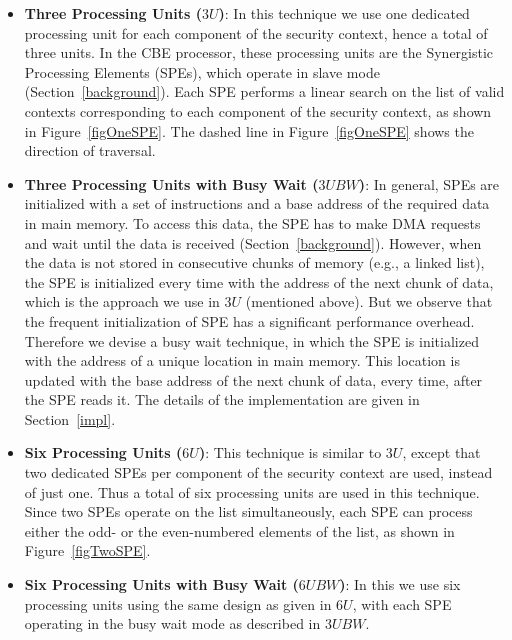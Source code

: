\documentclass[conference]{IEEEtran}
\newcommand{\eat}[1]{}
\begin{document}
\begin{itemize}

\item \textbf{Three Processing Units ($3U$)}: In this technique we use
  one dedicated processing unit for each component of the security
  context, hence a total of three units.  In the CBE processor, these
  processing units are the Synergistic Processing Elements (SPEs),
  which operate in slave mode (Section~\ref{background}).  Each SPE
  performs a linear search on the list of valid contexts corresponding
  to each component of the security context, as shown in
  Figure~\ref{figOneSPE}.  The dashed line in Figure~\ref{figOneSPE}
  shows the direction of traversal.

\item \textbf{Three Processing Units with Busy Wait ($3UBW$)}: In
  general, SPEs are initialized with a set of instructions and a base
  address of the required data in main memory.  To access this data,
  the SPE has to make DMA requests and wait until the data is received
  (Section~\ref{background}).  However, when the data is not stored in
  consecutive chunks of memory (e.g., a linked list), the SPE is
  initialized every time with the address of the next chunk of data,
  which is the approach we use in $3U$ (mentioned above).  But we
  observe that the frequent initialization of SPE has a significant
  performance overhead.  Therefore we devise a busy wait technique, in
  which the SPE is initialized with the address of a unique location
  in main memory\eat{ instead of the base address of the data}.  This
  location is updated with the base address of the next chunk of data,
  every time, after the SPE reads it.  The details of the implementation
  are given in Section~\ref{impl}.

\item \textbf{Six Processing Units ($6U$)}: This technique is similar
  to $3U$, except that two dedicated SPEs per component of the
  security context are used, instead of just one.  Thus a total of six
  processing units are used in this technique.  Since two SPEs operate
  on the list simultaneously, each SPE can process either the odd- or
  the even-numbered elements of the list, as shown in
  Figure~\ref{figTwoSPE}.

\item \textbf{Six Processing Units with Busy Wait ($6UBW$)}: In this
  we use six processing units using the same design as given in $6U$,
  with each SPE operating in the busy wait mode as described in
  $3UBW$.

\end{itemize}
\end{document}
